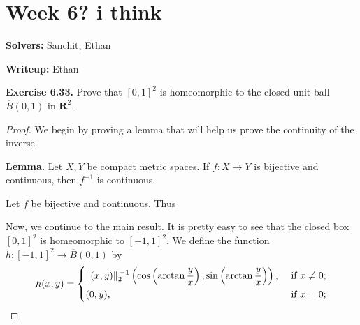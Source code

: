 \documentclass{article}
\newcommand{\R}{\mathbf{R}}
\newcommand{\cl}[1]{\overline{#1}}
\theoremstyle{plain} %
\numberwithin{thm}{section} %
\theoremstyle{definition}
\begin{document}
    \setcounter{section}{5}
    \section{Week 6? i think}
    \noindent\textbf{Solvers:} Sanchit, Ethan
    
    \noindent\textbf{Writeup:} Ethan
    
    \textbf{Exercise 6.33.} Prove that $[0,1]^2$ is homeomorphic to the closed unit ball $\cl{B}(0,1)$ in $\R^2$.

    \begin{proof}
        We begin by proving a lemma that will help us prove the continuity of the inverse.

        \textbf{Lemma.} Let \(X,Y\) be compact metric spaces. If \(f:X\to Y\) is bijective and continuous, then \(f^{-1}\) is continuous.

        Let \(f\) be bijective and continuous. Thus

        Now, we continue to the main result. It is pretty easy to see that the closed box \([0,1]^2\) is homeomorphic to \([-1,1]^2\). We define the function \(h:[-1,1]^2 \to \cl{B}(0,1)\) by
        \[
            h(x,y)=\begin{dcases}
                \|(x,y)\| _2 ^{\, -1} \left(\cos \left(\arctan \frac{y}{x}\right), \sin\left(\arctan \frac{y}{x}\right)\right), &\text{ if } x \neq 0 ;\\
                (0,y), &\text{ if } x=0 ;
            \end{dcases}
        \]
    \end{proof}
\end{document}

